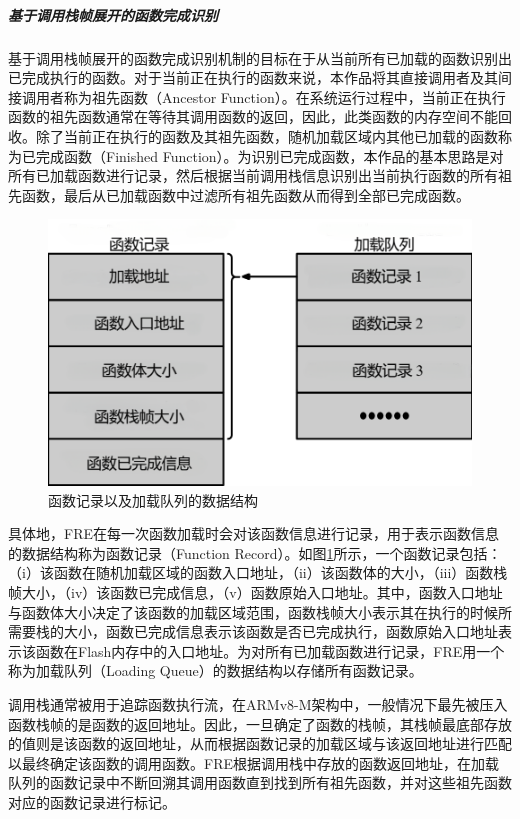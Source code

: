 \documentclass[UTF8,12pt,a4paper,twoside]{ctexart}
\numberwithin{figure}{section}
\begin{document}
\subparagraph{基于调用栈帧展开的函数完成识别}
\par 基于调用栈帧展开的函数完成识别机制的目标在于从当前所有已加载的函数识别出已完成执行的函数。对于当前正在执行的函数来说，本作品将其直接调用者及其间接调用者称为祖先函数（Ancestor Function）。在系统运行过程中，当前正在执行函数的祖先函数通常在等待其调用函数的返回，因此，此类函数的内存空间不能回收。除了当前正在执行的函数及其祖先函数，随机加载区域内其他已加载的函数称为已完成函数（Finished Function）。为识别已完成函数，本作品的基本思路是对所有已加载函数进行记录，然后根据当前调用栈信息识别出当前执行函数的所有祖先函数，最后从已加载函数中过滤所有祖先函数从而得到全部已完成函数。
\begin{figure}[H]
    \centering
    \includegraphics[scale=0.5]{graph/dataStructure.png}
    \caption{函数记录以及加载队列的数据结构}
    \label{fig:dataStructure}
\end{figure}
\par 具体地，FRE在每一次函数加载时会对该函数信息进行记录，用于表示函数信息的数据结构称为函数记录（Function Record）。如图\ref{fig:dataStructure}所示，一个函数记录包括：（i）该函数在随机加载区域的函数入口地址，（ii）该函数体的大小，（iii）函数栈帧大小，（iv）该函数已完成信息，（v）函数原始入口地址。其中，函数入口地址与函数体大小决定了该函数的加载区域范围，函数栈帧大小表示其在执行的时候所需要栈的大小，函数已完成信息表示该函数是否已完成执行，函数原始入口地址表示该函数在Flash内存中的入口地址。为对所有已加载函数进行记录，FRE用一个称为加载队列（Loading Queue）的数据结构以存储所有函数记录。
\par 调用栈通常被用于追踪函数执行流，在ARMv8-M架构中，一般情况下最先被压入函数栈帧的是函数的返回地址。因此，一旦确定了函数的栈帧，其栈帧最底部存放的值则是该函数的返回地址，从而根据函数记录的加载区域与该返回地址进行匹配以最终确定该函数的调用函数。FRE根据调用栈中存放的函数返回地址，在加载队列的函数记录中不断回溯其调用函数直到找到所有祖先函数，并对这些祖先函数对应的函数记录进行标记。
\end{document}
